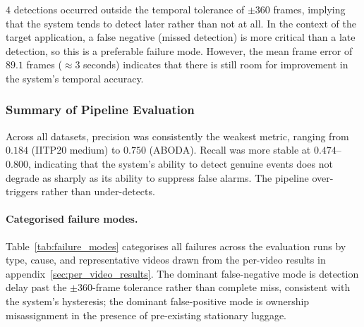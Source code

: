 $4$ detections occurred outside the temporal tolerance of $\pm 360$ frames, implying that
the system tends to detect later rather than not at all. In the context of the target application,
a false negative (missed detection) is more critical than a late detection, so
this is a preferable failure mode. However, the mean frame error of $89.1$ frames
($\approx 3$ seconds) indicates that there is still room for improvement in the system's
temporal accuracy.

\subsubsection{Summary of Pipeline Evaluation}

Across all datasets, precision was consistently the weakest metric, ranging
from $0.184$ (IITP20 medium) to $0.750$ (ABODA). Recall was more stable at
$0.474$--$0.800$, indicating that the system's ability to detect genuine events
does not degrade as sharply as its ability to suppress false alarms. The
pipeline over-triggers rather than under-detects.

\paragraph{Categorised failure modes.}
Table~\ref{tab:failure_modes} categorises all failures across the evaluation
runs by type, cause, and representative videos drawn from the per-video results
in appendix~\ref{sec:per_video_results}. The dominant false-negative mode is
detection delay past the $\pm 360$-frame tolerance rather than complete miss,
consistent with the system's hysteresis; the dominant false-positive mode is
ownership misassignment in the presence of pre-existing stationary luggage.

